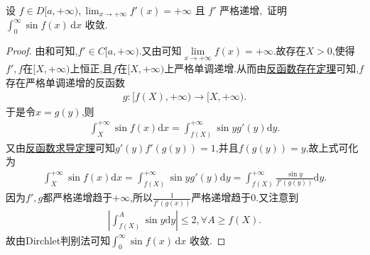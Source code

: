 \documentclass[../../main.tex]{subfiles}%
\begin{document}
\begin{example}
设
\(
f \in D[a, +\infty), \lim_{x \to +\infty} f'(x) = +\infty \text{ 且 } f' \text{ 严格递增},
\)
证明 \(\int_{0}^{\infty} \sin f(x) \, \mathrm{d}x\) 收敛.
\end{example}
\begin{proof}
由和可知,$f'\in C[a,+\infty)$.又由可知$\underset{x\rightarrow +\infty}{\lim}f\left( x \right) =+\infty$.故存在$X>0$,使得$f',f$在$[X,+\infty)$上恒正,且$f$在$[X,+\infty)$上严格单调递增.从而由\hyperref[theorem:反函数存在定理]{反函数存在定理}可知,$f$存在严格单调递增的反函数
\begin{align*}
g:[f(X),+\infty)\to [X,+\infty).
\end{align*}
于是令$x=g(y)$,则
\begin{align*}
\int_X^{+\infty}{\sin f\left( x \right) \mathrm{d}x}=\int_{f\left( X \right)}^{+\infty}{\sin y}g'\left( y \right) \mathrm{d}y.
\end{align*}
又由\hyperref[theorem:反函数求导定理]{反函数求导定理}可知$g'(y)f'(g(y))=1$,并且$f(g(y))=y$,故上式可化为
\begin{align*}
\int_X^{+\infty}{\sin f\left( x \right) \mathrm{d}x}=\int_{f\left( X \right)}^{+\infty}{\sin y}g' \left( y \right) \mathrm{d}y=\int_{f\left( X \right)}^{+\infty}{\frac{\sin y}{f'\left( g\left( y \right) \right)}}\mathrm{d}y.
\end{align*}
因为$f',g$都严格递增趋于$+\infty$,所以$\frac{1}{f'(g(x))}$严格递增趋于0.又注意到
\begin{align*}
\left| \int_{f\left( X \right)}^A{\sin y}\mathrm{d}y \right|\leqslant 2,\forall A\geqslant f\left( X \right) .
\end{align*}
故由Dirchlet判别法可知\(\int_{0}^{\infty} \sin f(x) \, \mathrm{d}x\) 收敛.
\end{proof}
\end{document}

